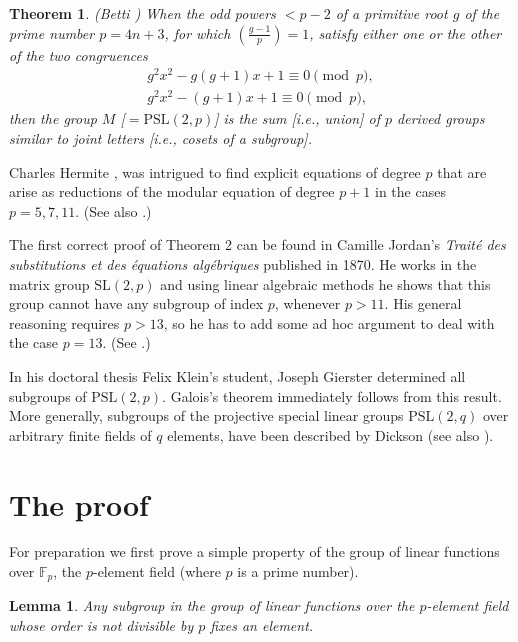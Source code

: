 \documentclass[reqno,12pt]{amsart}
\newtheorem{theorem}{Theorem}
\newtheorem*{lemma}{Lemma}
\theoremstyle{definition}
\newcommand{\PSL}{\mathrm{PSL}}
\newcommand{\SL}{\mathrm{SL}}
\begin{document}
\begin{theorem}
(Betti \cite[p.~88]{Betti})
When the odd powers $<p-2$ of a primitive root $g$ of the prime number
$p=4n+3$, for which $\left( \frac{g-1}{p}\right)=1$, satisfy either one or the other
of the two congruences
\begin{gather}
g^2x^2-g(g+1)x+1\equiv 0 \pmod{p},\\
g^2x^2-(g+1)x+1\equiv 0 \pmod{p},
\end{gather}
then the group $M$ [$=\PSL(2,p)$] is the sum [i.e., union] of $p$ derived groups similar to joint letters
[i.e., cosets of a subgroup].
\end{theorem}

Charles Hermite \cite{Hermite}, \cite{HermiteOeuvres} was intrigued to find explicit equations of degree $p$ that
are arise as reductions of the modular equation of degree $p+1$ in the cases $p=5,7,11$.
(See also \cite{Goldstein}.)

The first correct proof of Theorem 2 can be found in Camille Jordan's
{\it Trait\'e des substitutions et des \'equations alg\'ebriques} published in 1870. He works in
the matrix group $\SL(2,p)$ and using linear algebraic methods he shows that this group
cannot have any subgroup of index $p$, whenever $p>11$. His general reasoning requires
$p>13$, so he has to add some ad hoc argument to deal with the case $p=13$. (See \cite[pp.~347--351]{Jordan}.)

In his doctoral thesis \cite{Gierster} Felix Klein's student, Joseph Gierster determined all subgroups
of $\PSL(2,p)$. Galois's theorem immediately follows from this result. More generally, subgroups of
the projective special linear groups $\PSL(2,q)$ over arbitrary finite fields of $q$ elements, have
been described by Dickson \cite{Dickson} (see also \cite{Huppert}).

\section{The proof}\label{theproof}

For preparation we first prove a simple property of the group of linear functions
over $\mathbb{F}_p$, the $p$-element field (where $p$ is a prime number).

\begin{lemma}
Any subgroup in the group of linear functions over the $p$-element field
whose order is not divisible by $p$ fixes an element.
\end{lemma}
\end{document}
